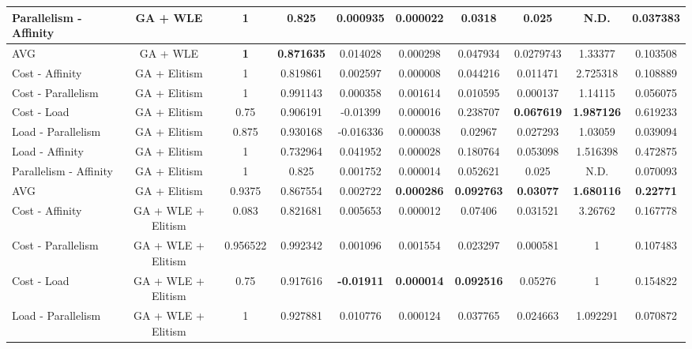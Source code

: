 \begin{sidewaystable}[htbp]
\begin{center}
{\begin{tabular}{l||c|c|c|c|c|c|c|c|c}
 Parallelism - Affinity & GA + WLE & 1          & 0.825             & 0.000935 & 0.000022 & 0.0318   & 0.025      & N.D.   & 0.037383  \\ \hline\hline
 AVG                    & GA + WLE & \textbf{1} & \textbf{0.871635} & 0.014028 & 0.000298 & 0.047934 & 0.0279743 & 1.33377 & 0.103508
  \\ \hline\hline
 Cost - Affinity        & GA + Elitism & 1      & 0.819861 & 0.002597  & 0.000008           & 0.044216          & 0.011471         & 2.725318         & 0.108889 \\ \hline
 Cost - Parallelism     & GA + Elitism & 1      & 0.991143 & 0.000358  & 0.001614           & 0.010595          & 0.000137         & 1.14115          & 0.056075  \\ \hline
 Cost - Load            & GA + Elitism & 0.75   & 0.906191 & -0.01399  & 0.000016           & 0.238707          & \textbf{0.067619}         & \textbf{1.987126} & 0.619233 \\ \hline
 Load - Parallelism     & GA + Elitism & 0.875  & 0.930168 & -0.016336 & 0.000038           & 0.02967           & 0.027293         & 1.03059           & 0.039094 \\ \hline
 Load - Affinity        & GA + Elitism & 1      & 0.732964 & 0.041952  & 0.000028           & 0.180764          & 0.053098         & 1.516398          & 0.472875  \\ \hline
 Parallelism - Affinity & GA + Elitism & 1      & 0.825    & 0.001752  & 0.000014           & 0.052621          & 0.025            & N.D.              & 0.070093  \\ \hline\hline
 AVG                    & GA + Elitism & 0.9375 & 0.867554 & 0.002722  & \textbf{0.000286}  & \textbf{0.092763} & \textbf{0.03077} & \textbf{1.680116} & \textbf{0.22771}
  \\ \hline\hline
 Cost - Affinity        & GA + WLE + Elitism & 0.083    & 0.821681 & 0.005653          & 0.000012          & 0.07406           & 0.031521 & 3.26762 & 0.167778  \\ \hline
 Cost - Parallelism     & GA + WLE + Elitism & 0.956522 & 0.992342 & 0.001096          & 0.001554          & 0.023297          & 0.000581 & 1 & 0.107483  \\ \hline
 Cost - Load            & GA + WLE + Elitism & 0.75     & 0.917616 & \textbf{-0.01911} & \textbf{0.000014} & \textbf{0.092516} & 0.05276  & 1 & 0.154822  \\ \hline
 Load - Parallelism     & GA + WLE + Elitism & 1        & 0.927881 & 0.010776          & 0.000124          & 0.037765          & 0.024663 & 1.092291 & 0.070872 \\ \hline

\end{tabular}}
\end{center}
\end{sidewaystable}
